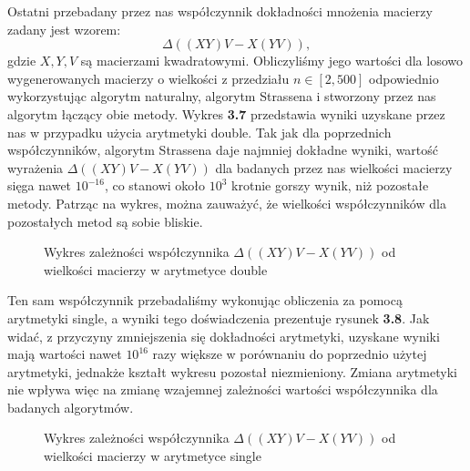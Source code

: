 Ostatni przebadany przez nas współczynnik dokładności mnożenia macierzy zadany jest wzorem:
$$\Delta((XY)V-X(YV)),$$
gdzie $X, Y, V$ są macierzami kwadratowymi. Obliczyliśmy jego wartości dla losowo wygenerowanych macierzy o wielkości z przedziału $n \in [2,500]$
odpowiednio wykorzystując algorytm naturalny, algorytm Strassena i stworzony przez nas algorytm łączący obie metody.
Wykres {\bf 3.7} przedstawia wyniki uzyskane przez nas w przypadku użycia arytmetyki double. Tak jak dla poprzednich współczynników, algorytm
Strassena daje najmniej dokładne wyniki, wartość wyrażenia $\Delta((XY)V-X(YV))$ dla badanych przez nas wielkości macierzy sięga nawet $10^{-16}$,
co stanowi około $10^{3}$ krotnie gorszy wynik, niż pozostałe metody. Patrząc na wykres,
można zauważyć, że wielkości współczynników dla pozostałych metod są sobie bliskie.
\begin{figure}[h!tb]
\begin{center}

\caption{Wykres zależności współczynnika $\Delta((XY)V-X(YV))$ od wielkości macierzy w arytmetyce double}
\end{center}
\end{figure}

Ten sam współczynnik przebadaliśmy wykonując obliczenia za pomocą arytmetyki single, a wyniki tego doświadczenia prezentuje rysunek {\bf 3.8}.
Jak widać, z przyczyny zmniejszenia się dokładności arytmetyki, uzyskane wyniki mają wartości nawet $10^{16}$ razy większe w porównaniu do poprzednio użytej
arytmetyki, jednakże kształt wykresu pozostał niezmieniony. Zmiana arytmetyki nie wpływa więc na zmianę wzajemnej zależności wartości współczynnika dla badanych algorytmów.
\begin{figure}[h!tb]
\begin{center}

\caption{Wykres zależności współczynnika $\Delta((XY)V-X(YV))$ od wielkości macierzy w arytmetyce single}
\end{center}
\end{figure}
